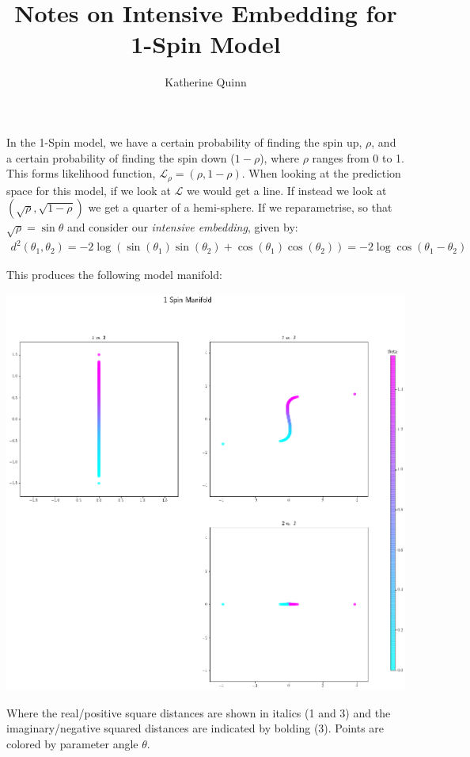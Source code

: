 \documentclass[11pt]{article}
\title{Notes on Intensive Embedding for 1-Spin Model}
\author{Katherine Quinn}
\begin{document}
\maketitle

In the 1-Spin model, we have a certain probability of finding the spin up, $\rho$, and a certain probability of finding the spin down ($1-\rho$), where $\rho$ ranges from 0 to 1. This forms likelihood function, $\mathcal{L}_\rho = (\rho,1-\rho)$. When looking at the prediction space for this model, if we look at $\mathcal{L}$ we would get a line. If instead we look at $(\sqrt{\rho},\sqrt{1-\rho})$ we get a quarter of a hemi-sphere. If we reparametrise, so that $\sqrt{\rho}=\sin{\theta}$ and consider our \textit{intensive embedding}, given by:
\begin{eqnarray}
d^2(\theta_1,\theta_2) = -2\log\left(\sin(\theta_1)\sin(\theta_2)+\cos(\theta_1)\cos(\theta_2) \right) = -2\log\cos(\theta_1-\theta_2)
\end{eqnarray}

This produces the following model manifold:

\begin{center}
\includegraphics[width=6in]{./manifold.png}
\end{center}

Where the real/positive square distances are shown in italics (1 and 3) and the imaginary/negative squared distances are indicated by bolding (3). Points are colored by parameter angle $\theta$.
\end{document}
